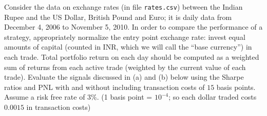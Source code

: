  Consider the data on exchange rates (in file \texttt{rates.csv}) between the Indian Rupee and the US Dollar, British Pound and Euro; it is daily data from December 4, 2006 to November 5, 2010. In order to compare the performance of a strategy, appropriately normalize the entry point exchange rate: invest equal amounts of capital (counted in INR, which we will call the ``base currency'') in each trade. Total portfolio return on each day should be computed as a weighted sum of returns from each active trade (weighted by the current value of each trade). Evaluate the signals discussed in (a) and (b) below using the Sharpe ratios and PNL with and without including transaction costs of $15$ basis points. Assume a risk free rate of $3\%$. (1 basis point = $10^{-4}$; so each dollar traded costs $0.0015$ in transaction costs)
